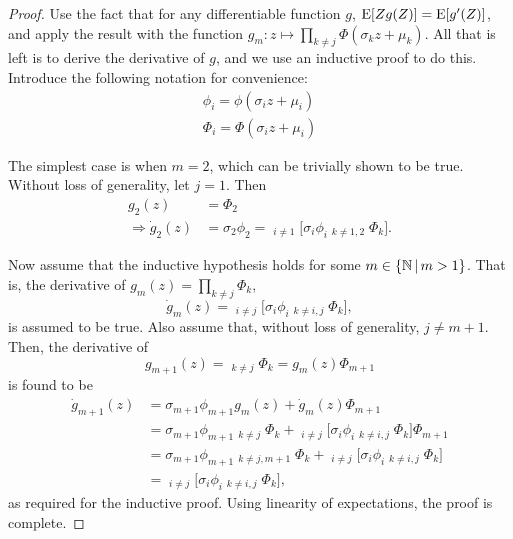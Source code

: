 \begin{proof}
  Use the fact that for any differentiable function $g$, $\operatorname{E}[Zg(Z)] = \operatorname{E}[g'(Z)]$, and apply the result with the function $g_m:z \mapsto \prod_{k \neq j} \Phi(\sigma_k z + \mu_k)$. All that is left is to derive the derivative of $g$, and we use an inductive proof to do this. 
  Introduce the following notation for convenience:
  \begin{align*}
    \phi_i = \phi(\sigma_i z + \mu_i) \\
    \Phi_i = \Phi(\sigma_i z + \mu_i) 
  \end{align*}
  
  The simplest case is when $m=2$, which can be trivially shown to be true. Without loss of generality, let $j=1$. Then
  \begin{align*}
    g_2(z) &= \Phi_2 \\
    \Rightarrow \dot g_2(z) &= \sigma_2 \phi_2 = \mathop{\sum_{i=1}^2}_{i \neq 1} \Bigg[ \sigma_i \phi_i \mathop{\sum_{k=1}^2}_{k \neq 1,2} \Phi_k \Bigg].
  \end{align*}
  
  Now assume that the inductive hypothesis holds for some $m \in \{\mathbb{N} \, | \, m > 1\}$. 
  That is, the derivative of $g_m(z) = \prod_{k \neq j} \Phi_k$, 
  \[
    \dot{g}_m(z) = \mathop{\sum_{i=1}^m}_{i \neq j} \bigg[  \sigma_i \phi_i \mathop{\prod_{k=1}^m}_{k \neq i,j} \Phi_k \bigg],
  \]
  is assumed to be true. 
  Also assume that, without loss of generality, $j \neq m+1$.
  Then, the derivative of
  \[
    g_{m+1}(z) = \mathop{\prod_{k=1}^{m+1}}_{k \neq j} \Phi_k = g_m(z) \Phi_{m+1}
  \]
  is found to be
  \begin{align*}
    \dot g_{m+1}(z) &= \sigma_{m+1} \phi_{m+1} g_m(z) + \dot g_m(z) \Phi_{m+1} \\
    &= \sigma_{m+1} \phi_{m+1} \mathop{\prod_{k=1}^m}_{k \neq j} \Phi_k + \mathop{\sum_{i=1}^m}_{i \neq j} \bigg[  \sigma_i \phi_i \mathop{\prod_{k=1}^m}_{k \neq i,j} \Phi_k \bigg] \Phi_{m+1} \\
    &= \sigma_{m+1} \phi_{m+1} \mathop{\prod_{k=1}^{m+1}}_{k \neq j, m+1} \Phi_k + \mathop{\sum_{i=1}^m}_{i \neq j} \bigg[  \sigma_i \phi_i \mathop{\prod_{k=1}^{m+1}}_{k \neq i,j} \Phi_k \bigg] \\
    &= \mathop{\sum_{i=1}^{m+1}}_{i \neq j} \bigg[  \sigma_i \phi_i \mathop{\prod_{k=1}^{m+1}}_{k \neq i,j} \Phi_k \bigg],
  \end{align*}
  as required for the inductive proof.
  Using linearity of expectations, the proof is complete.
\end{proof}



